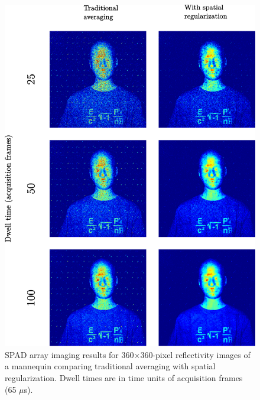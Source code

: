 \begin{figure}[h!]
\centerline{\includegraphics[width=15cm]{figure-first-spad-pvnrt-i.pdf}}
\caption{SPAD array imaging results for 360$\times$360-pixel reflectivity images of a mannequin comparing traditional averaging with spatial regularization. Dwell times are in time units of acquisition frames (65 $\mu$s).}
\label{figure:first-spad-pvnrt-i}
\end{figure}

